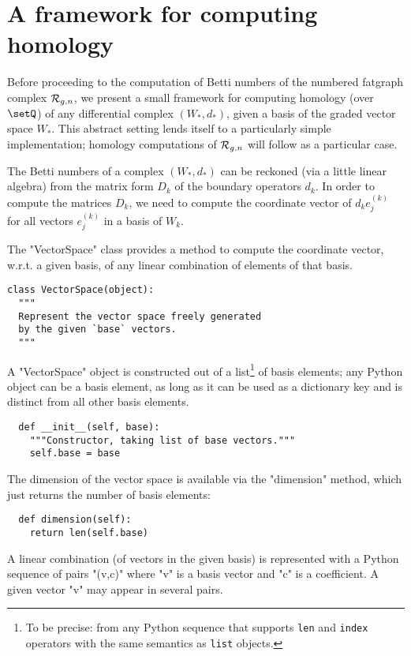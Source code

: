 \section{A framework for computing homology}
\label{sec:homology}

Before proceeding to the computation of Betti numbers of the numbered
fatgraph complex $\mathcal{R}_{g,n}$, we present a small framework for computing
homology (over $\setQ$) of any differential complex $(W_*, d_*)$, given a
basis of the graded vector space $W_*$.  This abstract setting lends
itself to a particularly simple implementation; homology computations
of $\mathcal{R}_{g,n}$ will follow as a particular case.

The Betti numbers of a complex $(W_*, d_*)$ can be reckoned (via a
little linear algebra) from the matrix form $D_k$ of the boundary
operators $d_k$.  In order to compute the matrices $D_k$, we need to
compute the coordinate vector of $d_ke^{(k)}_j$ for all vectors
$e^{(k)}_j$ in a basis of $W_k$.

The "VectorSpace" class provides a method to compute the coordinate
vector, w.r.t. a given basis, of any linear combination of elements of
that basis.
\begin{lstlisting}
class VectorSpace(object):
  """
  Represent the vector space freely generated 
  by the given `base` vectors.
  """
\end{lstlisting}
A "VectorSpace" object is constructed out of a list\footnote{To be
  precise: from any Python sequence that supports \Verb'len' and
  \Verb'index' operators with the same semantics as \Verb'list'
  objects.} of basis elements; any Python object can be a basis
element, as long as it can be used as a dictionary key and is distinct
from all other basis elements.
\begin{lstlisting}
  def __init__(self, base):
    """Constructor, taking list of base vectors."""
    self.base = base

\end{lstlisting}
The dimension of the vector space is available via the "dimension"
method, which just returns the number of basis elements:
\begin{lstlisting}
  def dimension(self):
    return len(self.base)

\end{lstlisting}

A linear combination (of vectors in the given basis) is represented
with a Python sequence of pairs "(v,c)" where "v" is a basis vector
and "c" is a coefficient.  A given vector "v" may appear in several
pairs. 

